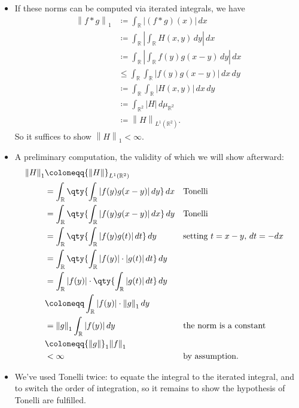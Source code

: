 \begin{solution}

\begin{itemize}
\item
  If these norms can be computed via iterated integrals, we have
  \begin{align*}
  {\left\lVert {f\ast g} \right\rVert}_1 
  &\coloneqq\int_{\mathbb{R}}{\left\lvert {(f\ast g)(x)} \right\rvert} \,dx\\
  &\coloneqq\int_{\mathbb{R}}{\left\lvert {\int_{\mathbb{R}}H(x, y) \,dy} \right\rvert} \,dx\\
  &\coloneqq\int_{\mathbb{R}}{\left\lvert {\int_{\mathbb{R}}f(y)g(x-y) \,dy} \right\rvert} \,dx\\
  &\leq \int_{\mathbb{R}}\int_{\mathbb{R}}{\left\lvert {f(y) g(x-y)} \right\rvert} \,dx\,dy\\
  &\coloneqq\int_{\mathbb{R}}\int_{\mathbb{R}}{\left\lvert {H(x ,y)} \right\rvert}\,dx\,dy\\
  &\coloneqq\int_{{\mathbb{R}}^2} {\left\lvert {H} \right\rvert} \,d\mu_{{\mathbb{R}}^2} \\
  &\coloneqq{\left\lVert {H} \right\rVert}_{L^1({\mathbb{R}}^2)}
  .\end{align*}
  So it suffices to show \({\left\lVert {H} \right\rVert}_1 < \infty\).
\item
  A preliminary computation, the validity of which we will show
  afterward:
  \begin{align*}
  {\left\lVert {H} \right\rVert}_1
  &\coloneqq{\left\lVert {H} \right\rVert}_{L^1({\mathbb{R}}^2)} \\
  &= \int _{\mathbb{R}}\qty{ \int_{\mathbb{R}}{\left\lvert {f(y)g(x-y)} \right\rvert}  \, dy } \, dx && \text{Tonelli} \\ 
  &= \int _{\mathbb{R}}\qty{ \int_{\mathbb{R}}{\left\lvert {f(y)g(x-y)} \right\rvert}  \, dx} \, dy && \text{Tonelli} \\
  &= \int _{\mathbb{R}}\qty{ \int_{\mathbb{R}}{\left\lvert {f(y)g(t)} \right\rvert}  \, dt} \, dy && \text{setting } t=x-y, \,dt = - dx \\
  &= \int _{\mathbb{R}}\qty{ \int_{\mathbb{R}}{\left\lvert {f(y)} \right\rvert}\cdot {\left\lvert {g(t)} \right\rvert}  \, dt}\, dy \\
  &= \int _{\mathbb{R}}{\left\lvert {f(y)} \right\rvert} \cdot \qty{ \int_{\mathbb{R}}{\left\lvert {g(t)} \right\rvert}  \, dt}\, dy \\
  &\coloneqq\int _{\mathbb{R}}{\left\lvert {f(y)} \right\rvert} \cdot {\left\lVert {g} \right\rVert}_1 \,dy \\
  &= {\left\lVert {g} \right\rVert}_1 \int _{\mathbb{R}}{\left\lvert {f(y)} \right\rvert} \,dy &&\text{the norm is a constant} \\
  &\coloneqq{\left\lVert {g} \right\rVert}_1 {\left\lVert {f} \right\rVert}_1  \\
  &< \infty && \text{by assumption}
  .\end{align*}
\item
  We've used Tonelli twice: to equate the integral to the iterated
  integral, and to switch the order of integration, so it remains to
  show the hypothesis of Tonelli are fulfilled.
\end{itemize}


\end{solution}
